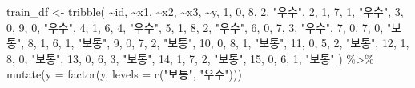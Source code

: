 \documentclass[
]{book}
\newenvironment{Shaded}{\begin{snugshade}}{\end{snugshade}}
\newcommand{\AttributeTok}[1]{\textcolor[rgb]{0.77,0.63,0.00}{#1}}
\newcommand{\DecValTok}[1]{\textcolor[rgb]{0.00,0.00,0.81}{#1}}
\newcommand{\FunctionTok}[1]{\textcolor[rgb]{0.00,0.00,0.00}{#1}}
\newcommand{\NormalTok}[1]{#1}
\newcommand{\OtherTok}[1]{\textcolor[rgb]{0.56,0.35,0.01}{#1}}
\newcommand{\SpecialCharTok}[1]{\textcolor[rgb]{0.00,0.00,0.00}{#1}}
\newcommand{\StringTok}[1]{\textcolor[rgb]{0.31,0.60,0.02}{#1}}
\begin{document}
\begin{Shaded}
\begin{Highlighting}[]
\NormalTok{train\_df }\OtherTok{\textless{}{-}} \FunctionTok{tribble}\NormalTok{(}
  \SpecialCharTok{\textasciitilde{}}\NormalTok{id, }\SpecialCharTok{\textasciitilde{}}\NormalTok{x1, }\SpecialCharTok{\textasciitilde{}}\NormalTok{x2, }\SpecialCharTok{\textasciitilde{}}\NormalTok{x3, }\SpecialCharTok{\textasciitilde{}}\NormalTok{y,}
  \DecValTok{1}\NormalTok{, }\DecValTok{0}\NormalTok{, }\DecValTok{8}\NormalTok{, }\DecValTok{2}\NormalTok{, }\StringTok{"우수"}\NormalTok{,}
  \DecValTok{2}\NormalTok{, }\DecValTok{1}\NormalTok{, }\DecValTok{7}\NormalTok{, }\DecValTok{1}\NormalTok{, }\StringTok{"우수"}\NormalTok{,}
  \DecValTok{3}\NormalTok{, }\DecValTok{0}\NormalTok{, }\DecValTok{9}\NormalTok{, }\DecValTok{0}\NormalTok{, }\StringTok{"우수"}\NormalTok{,}
  \DecValTok{4}\NormalTok{, }\DecValTok{1}\NormalTok{, }\DecValTok{6}\NormalTok{, }\DecValTok{4}\NormalTok{, }\StringTok{"우수"}\NormalTok{,}
  \DecValTok{5}\NormalTok{, }\DecValTok{1}\NormalTok{, }\DecValTok{8}\NormalTok{, }\DecValTok{2}\NormalTok{, }\StringTok{"우수"}\NormalTok{,}
  \DecValTok{6}\NormalTok{, }\DecValTok{0}\NormalTok{, }\DecValTok{7}\NormalTok{, }\DecValTok{3}\NormalTok{, }\StringTok{"우수"}\NormalTok{,}
  \DecValTok{7}\NormalTok{, }\DecValTok{0}\NormalTok{, }\DecValTok{7}\NormalTok{, }\DecValTok{0}\NormalTok{, }\StringTok{"보통"}\NormalTok{,}
  \DecValTok{8}\NormalTok{, }\DecValTok{1}\NormalTok{, }\DecValTok{6}\NormalTok{, }\DecValTok{1}\NormalTok{, }\StringTok{"보통"}\NormalTok{,}
  \DecValTok{9}\NormalTok{, }\DecValTok{0}\NormalTok{, }\DecValTok{7}\NormalTok{, }\DecValTok{2}\NormalTok{, }\StringTok{"보통"}\NormalTok{,}
  \DecValTok{10}\NormalTok{, }\DecValTok{0}\NormalTok{, }\DecValTok{8}\NormalTok{, }\DecValTok{1}\NormalTok{, }\StringTok{"보통"}\NormalTok{,}
  \DecValTok{11}\NormalTok{, }\DecValTok{0}\NormalTok{, }\DecValTok{5}\NormalTok{, }\DecValTok{2}\NormalTok{, }\StringTok{"보통"}\NormalTok{,}
  \DecValTok{12}\NormalTok{, }\DecValTok{1}\NormalTok{, }\DecValTok{8}\NormalTok{, }\DecValTok{0}\NormalTok{, }\StringTok{"보통"}\NormalTok{,}
  \DecValTok{13}\NormalTok{, }\DecValTok{0}\NormalTok{, }\DecValTok{6}\NormalTok{, }\DecValTok{3}\NormalTok{, }\StringTok{"보통"}\NormalTok{,}
  \DecValTok{14}\NormalTok{, }\DecValTok{1}\NormalTok{, }\DecValTok{7}\NormalTok{, }\DecValTok{2}\NormalTok{, }\StringTok{"보통"}\NormalTok{,}
  \DecValTok{15}\NormalTok{, }\DecValTok{0}\NormalTok{, }\DecValTok{6}\NormalTok{, }\DecValTok{1}\NormalTok{, }\StringTok{"보통"}
\NormalTok{) }\SpecialCharTok{\%\textgreater{}\%}
  \FunctionTok{mutate}\NormalTok{(}\AttributeTok{y =} \FunctionTok{factor}\NormalTok{(y, }\AttributeTok{levels =} \FunctionTok{c}\NormalTok{(}\StringTok{"보통"}\NormalTok{, }\StringTok{"우수"}\NormalTok{)))}


\end{Highlighting}
\end{Shaded}
\end{document}
